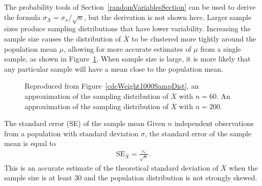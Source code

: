 \textD{\newpage}

The probability tools of Section~\ref{randomVariablesSection} can be used to derive the formula $\sigma_{\overline{X}} = \sigma_x/\sqrt{n}$, but the derivation is not shown here. Larger sample sizes produce sampling distributions that have lower variability. Increasing the sample size causes the distribution of $\overline{X}$ to be clustered more tightly around the population mean $\mu$, allowing for more accurate estimates of $\mu$ from a single sample, as shown in Figure~\ref{cdcSamplingVariabilityComparison}. When sample size is large, it is more likely that any particular sample will have a mean close to the population mean. 

\begin{figure}[h]
	\centering
	\caption{ Reproduced from Figure~\ref{cdcWeight1000SampDist}, an approximation of the sampling distribution of $\overline{X}$ with $n = 60$.  An approximation of the sampling distribution of $\overline{X}$ with $n = 200$.}
	\label{cdcSamplingVariabilityComparison}
\end{figure}


\begin{onebox}{The standard error (SE) of the sample mean}
Given $n$ independent observations from a population with standard deviation $\sigma$, the standard error of the sample mean is equal to
\begin{align*}
\text{SE}_{\overline{X}} = \frac{s_x}{\sqrt{n}}.
\label{seOfXBar}
\end{align*}
This is an accurate estimate of the theoretical standard deviation of $\overline{X}$ when the sample size is at least 30 and the population distribution is not strongly skewed.
\end{onebox}

